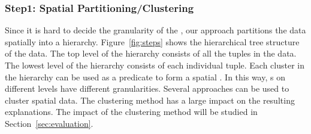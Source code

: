 \subsubsection{Step1: Spatial Partitioning/Clustering}
Since it is hard to decide the granularity of the {\explanation}, our approach partitions the data spatially into a hierarchy. 
Figure~\ref{fig:steps} shows the hierarchical tree structure of the data. 
The top level of the hierarchy consists of all the tuples in the data. 
The lowest level of the hierarchy consists of each individual tuple. 
Each cluster in the hierarchy can be used as a predicate to form a spatial {\explanation}. 
In this way, {\explanation}s on different levels have different granularities. 
Several approaches can be used to cluster spatial data. The clustering method has a large impact on the resulting explanations. The impact of the clustering method will be studied in Section~\ref{sec:evaluation}.






